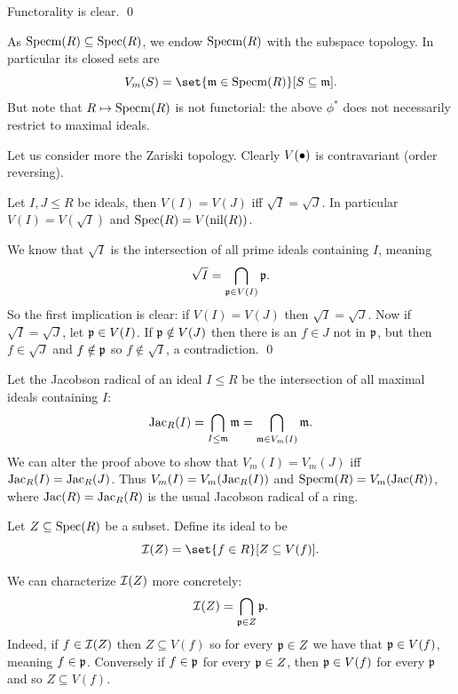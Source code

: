     Functorality is clear.
    \qed

\eproof

\bnote

    As ${\rm Specm}(R)\subseteq{\rm Spec}(R)$, we endow ${\rm Specm}(R)$ with the subspace topology.
    In particular its closed sets are
    $$ V_m(S) = \set{\m\in\specm(R)}[S\subseteq\m] . $$
    But note that $R\mapsto{\rm Specm}(R)$ is not functorial: the above $\phi^*$ does not necessarily restrict to maximal ideals.

\enote

Let us consider more the Zariski topology.
Clearly $V(\bullet)$ is contravariant (order reversing).

\bprop

    Let $I,J\leq R$ be ideals, then $V(I)=V(J)$ iff $\sqrt I=\sqrt J$.
    In particular $V(I)=V(\sqrt I)$ and ${\rm Spec}(R)=V({\rm nil}(R))$.

\eprop

\bproof

    We know that $\sqrt I$ is the intersection of all prime ideals containing $I$, meaning
    $$ \sqrt I = \bigcap_{{{\frak p}}\in V(I)}{{\frak p}} . $$
    So the first implication is clear: if $V(I)=V(J)$ then $\sqrt I=\sqrt J$.
    Now if $\sqrt I=\sqrt J$, let ${{\frak p}}\in V(I)$.
    If ${{\frak p}}\notin V(J)$ then there is an $f\in J$ not in ${{\frak p}}$, but then $f\in\sqrt J$ and $f\notin{{\frak p}}$ so $f\notin\sqrt I$, a contradiction.
    \qed

\eproof

\bnote

    Let the {\emphcolor Jacobson radical} of an ideal $I\leq R$ be the intersection of all maximal ideals containing $I$:
    $$ {\rm Jac}_R(I) = \bigcap_{I\leq{{\frak m}}}{{\frak m}} = \bigcap_{{{\frak m}}\in V_m(I)}{{\frak m}} . $$
    We can alter the proof above to show that $V_m(I)=V_m(J)$ iff ${\rm Jac}_R(I)={\rm Jac}_R(J)$.
    Thus $V_m(I)=V_m({\rm Jac}_R(I))$ and ${\rm Specm}(R)=V_m({\rm Jac}(R))$, where ${\rm Jac}(R)={\rm Jac}_R(R)$ is the usual Jacobson radical of a ring.

\enote

\bdefn

    Let $Z\subseteq{\rm Spec}(R)$ be a subset.
    Define its {\emphcolor ideal} to be
    $$ \ideal(Z) = \set{f\in R}[Z\subseteq V(f)] . $$

\edefn

We can characterize ${\cal I}(Z)$ more concretely:
$$ {\cal I}(Z) = \bigcap_{{{\frak p}}\in Z}{{\frak p}} . $$
Indeed, if $f\in{\cal I}(Z)$ then $Z\subseteq V(f)$ so for every ${{\frak p}}\in Z$ we have that ${{\frak p}}\in V(f)$, meaning $f\in{{\frak p}}$.
Conversely if $f\in{{\frak p}}$ for every ${{\frak p}}\in Z$, then ${{\frak p}}\in V(f)$ for every ${{\frak p}}$ and so $Z\subseteq V(f)$.

